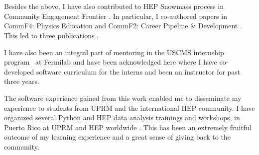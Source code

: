 \chapter[Appendix]{\hypertarget{appendix}{}}


Besides the above, I have also contributed to HEP Snowmass process \cite{snowmass_site} in Community Engagement Frontier \cite{snowmass_engagement}. In particular, I co-authored papers in CommF4: Physics Education \cite{snowmass_edu}  and CommF2: Career Pipeline \& Development \cite{snowmass_carrerdev}. This led to three publications \cite{malik2022broadening,bardeen2022particle,malik2022facilitating}.

I have also been an integral part of mentoring in the USCMS internship program~\cite{pursue_site,fnal_int} at Fermilab and have been acknowledged here \cite{bose2022us,banerjee2024novel} where I have co-developed software curriculum for the interns and been an instructor for past three years.




The software experience gained from this work enabled me to disseminate my experience to students from UPRM and the international HEP community. I have organized several Python and HEP data analysis trainings and workshops, in Puerto Rico at UPRM and HEP worldwide \cite{carp21,carp22,carp22b,DAFLR,matplot,MLatCROEM23,PythoSeriesBasics,PythoSeriesMatplot,PythoSeriesML,PythoSeriesPandas,UPRM_ML_Undergrad}.
This has been an extremely fruitful outcome of my learning experience and a great sense of giving back to the community.


\printbibliography[keyword=page,title={Snowmass and US CMS Internships URLs},heading=subbibintoc]

\printbibliography[keyword=pubs,title={Publications on Broader Impacts},heading=subbibintoc]


\printbibliography[keyword=workshop,title={Software Trainings and Workshops},heading=subbibintoc]








